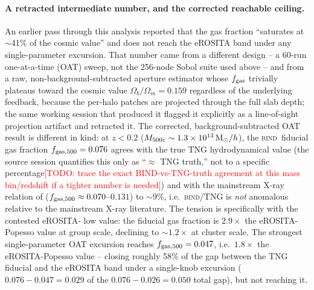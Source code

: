 \documentclass[11pt]{article}
\newcommand{\bind}{\textsc{bind}}
\newcommand{\fgas}{f_{\rm gas}}
\newcommand{\Msun}{{\rm M}_\odot}
\newcommand{\Mfive}{M_{500c}}
\newcommand{\todo}[1]{\textcolor{red}{[TODO: #1]}}
\begin{document}
\paragraph{A retracted intermediate number, and the corrected reachable ceiling.}
An earlier pass through this analysis reported that the gas fraction
``saturates at $\sim$41\% of the cosmic value'' and does not reach the
eROSITA band under any single-parameter excursion. %
That number came from a different design -- a 60-run one-at-a-time (OAT)
sweep, not the 256-node Sobol suite used above -- and from a raw,
non-background-subtracted aperture estimator whose $\fgas$ trivially plateaus
toward the cosmic value $\Omega_b/\Omega_m=0.159$ regardless of the underlying
feedback, because the per-halo patches are projected through the full slab
depth; the same working session that produced it flagged it explicitly as a
line-of-sight projection artifact and retracted it. %
The corrected, background-subtracted OAT result is different in kind: at
$z<0.2$ ($\Mfive\sim1.3\times10^{13}\,\Msun/h$), the \bind\ fiducial gas
fraction $f_{\rm gas,500}=0.076$ agrees with the true TNG hydrodynamical value
(the source session quantifies this only as ``$\approx$ TNG truth,'' not to a
specific percentage\todo{trace the exact BIND-vs-TNG-truth agreement at this
mass bin/redshift if a tighter number is needed}) and with the mainstream
X-ray relation of \citet{eckert19}
($f_{\rm gas,500}\approx0.070$--$0.131$) to $\sim$9\%, i.e.\ \bind/TNG is
\emph{not} anomalous relative to the mainstream X-ray literature. %
The tension is specifically with the contested eROSITA-\citet{popesso24} low
value: the fiducial gas fraction is $2.9\times$ the eROSITA-Popesso value at
group scale, declining to $\sim1.2\times$ at cluster scale. %
The strongest single-parameter OAT excursion reaches $f_{\rm gas,500}=0.047$,
i.e.\ $1.8\times$ the eROSITA-Popesso value -- closing roughly 58\% of the gap
between the TNG fiducial and the eROSITA band under a single-knob excursion
($0.076-0.047=0.029$ of the $0.076-0.026=0.050$ total gap), but not reaching
it. %
\end{document}

